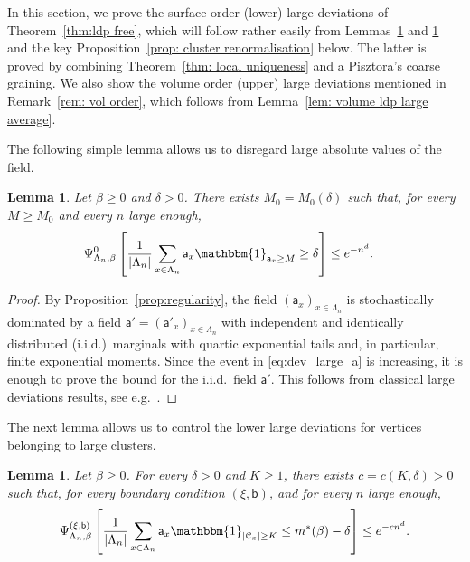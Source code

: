 \documentclass[11pt,a4paper]{article}
\newtheorem{lemma}[theorem]{Lemma}
\theoremstyle{definition}
\numberwithin{equation}{section}
\begin{document}
In this section, we prove the surface order (lower) large deviations of Theorem~\ref{thm:ldp free}, which will follow rather easily from Lemmas~\ref{lem: cutting a to finite values} and \ref{lem: volume ldp small average} and the key Proposition~\ref{prop: cluster renormalisation} below. The latter is proved by combining Theorem~\ref{thm: local uniqueness} and a Pisztora's coarse graining. 
We also show the volume order (upper) large deviations mentioned in Remark~\ref{rem: vol order}, which follows from Lemma~\ref{lem: volume ldp large average}.

The following simple lemma allows us to disregard large absolute values of the field.

\begin{lemma}\label{lem: cutting a to finite values}
Let $\beta\geq 0$ and $\delta>0$. There exists $M_0=M_0(\delta)$ such that, for every $M\geq M_0$ and every $n$ large enough,
\begin{align}\label{eq:dev_large_a}
\Psi^{0}_{\Lambda_n,\beta}\left[\frac{1}{|\Lambda_n|}\sum_{x\in \Lambda_n} \mathsf{a}_x \mathbbm{1}_{\mathsf{a}_x\geq M}\geq \delta\right]&\leq e^{-n^d}.
\end{align}
\end{lemma}

\begin{proof} 
    By Proposition~\ref{prop:regularity}, the field $(\mathsf{a}_x)_{x\in \Lambda_n}$ is stochastically dominated by a field $\mathsf{a}'=(\mathsf{a}'_x)_{x\in \Lambda_n}$ with independent and identically distributed (i.i.d.)~marginals with quartic exponential tails and, in particular, finite exponential moments. Since the event in \eqref{eq:dev_large_a} is increasing, it is enough to prove the bound for the i.i.d.~field $\mathsf{a}'$. This follows from classical large deviations results, see e.g.~\cite[Theorem 2.7.7]{durrett2019probability}.
\end{proof}

The next lemma allows us to control the lower large deviations for vertices belonging to large clusters. 

\begin{lemma}\label{lem: volume ldp small average} Let $\beta\geq 0$. For every $\delta>0$ and $K\geq 1$, there exists $c=c(K,\delta)>0$ such that, for every boundary condition $(\xi,\mathsf{b})$, and for every $n$ large enough,
\begin{equation}\label{eq: volume ldp small average}
\Psi_{\Lambda_n,\beta}^{(\xi,\mathsf{b})}\left[\frac{1}{|\Lambda_n|}\sum_{x\in \Lambda_n}\mathsf{a}_x\mathbbm{1}_{|\mathcal{C}_x|\geq K}\leq m^*(\beta)-\delta\right]\leq e^{-cn^d}.
\end{equation}
\end{lemma}
\end{document}

